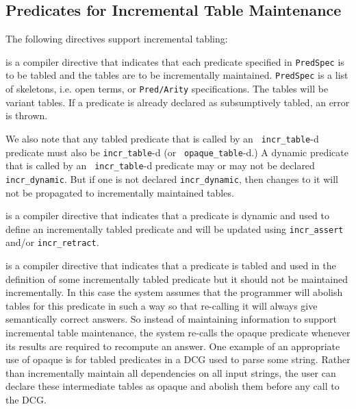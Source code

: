 \subsection{Predicates for Incremental Table Maintenance}

The following directives support incremental tabling:

\begin{description}
is a compiler directive that indicates that each predicate specified
in {\tt PredSpec} is to be tabled and the tables are to be
incrementally maintained.  {\tt PredSpec} is a list of skeletons,
i.e. open terms, or {\tt Pred/Arity} specifications.  The tables will
be variant tables.  If a predicate is already declared as
subsumptively tabled, an error is thrown.

We also note that any tabled predicate that is called by an {\tt
incr\_table}-d predicate must also be {\tt incr\_table}-d (or {\tt
opaque\_table}-d.)  A dynamic predicate that is called by an {\tt
incr\_table}-d predicate may or may not be declared {\tt
incr\_dynamic}.  But if one is not declared {\tt incr\_dynamic}, then
changes to it will not be propagated to incrementally maintained
tables.

is a compiler directive that indicates that a predicate is dynamic and
used to define an incrementally tabled predicate and will be updated
using {\tt incr\_assert} and/or {\tt incr\_retract}.  

is a compiler directive that indicates that a predicate is tabled and
used in the definition of some incrementally tabled predicate but it
should not be maintained incrementally.  In this case the system
assumes that the programmer will abolish tables for this predicate in
such a way so that re-calling it will always give semantically correct
answers.  So instead of maintaining information to support incremental
table maintenance, the system re-calls the opaque predicate whenever
its results are required to recompute an answer.  One example of an
appropriate use of opaque is for tabled predicates in a DCG used to
parse some string.  Rather than incrementally maintain all
dependencies on all input strings, the user can declare these
intermediate tables as opaque and abolish them before any call to the
DCG.

\end{description}


